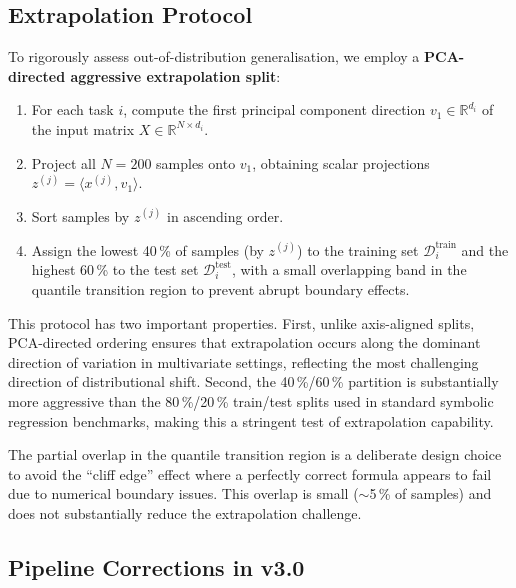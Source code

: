 \documentclass[twoside,11pt]{article}
\begin{document}
\subsection{Extrapolation Protocol}\label{subsec:extrapolation-protocol}
\label{sec:split}

To rigorously assess out-of-distribution generalisation, we employ a
\textbf{PCA-directed aggressive extrapolation split}:

\begin{enumerate}[leftmargin=2em,label=\arabic*.]
  \item For each task $i$, compute the first principal component direction
    $v_1 \in \mathbb{R}^{d_i}$ of the input matrix $X \in \mathbb{R}^{N \times d_i}$.
  \item Project all $N=200$ samples onto $v_1$, obtaining scalar projections
    $z^{(j)} = \langle x^{(j)}, v_1 \rangle$.
  \item Sort samples by $z^{(j)}$ in ascending order.
  \item Assign the lowest 40\,\% of samples (by $z^{(j)}$) to the training set
    $\mathcal{D}^{\mathrm{train}}_i$ and the highest 60\,\% to the test set
    $\mathcal{D}^{\mathrm{test}}_i$, with a small overlapping band in the
    quantile transition region to prevent abrupt boundary effects.
\end{enumerate}

This protocol has two important properties.  First, unlike axis-aligned splits,
PCA-directed ordering ensures that extrapolation occurs along the dominant
direction of variation in multivariate settings, reflecting the most
challenging direction of distributional shift.  Second, the 40\,\%/60\,\%
partition is substantially more aggressive than the 80\,\%/20\,\% train/test
splits used in standard symbolic regression benchmarks, making this a stringent
test of extrapolation capability.

\begin{remark}
The partial overlap in the quantile transition region is a deliberate design choice
to avoid the ``cliff edge'' effect where a perfectly correct formula appears to
fail due to numerical boundary issues.  This overlap is small ($\sim$5\,\% of
samples) and does not substantially reduce the extrapolation challenge.
\end{remark}

\subsection{Pipeline Corrections in v3.0}\label{subsec:pipeline-corrections-in-v30}
\label{sec:r2_bugfix}
\label{sec:corrections}
\end{document}

